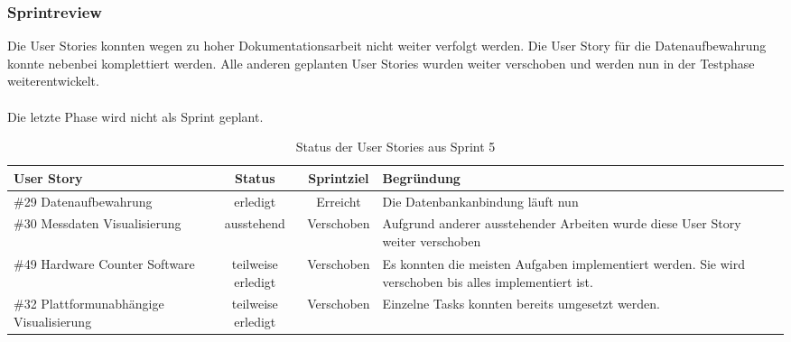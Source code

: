 \subsubsection*{Sprintreview}%
Die User Stories konnten wegen zu hoher Dokumentationsarbeit nicht weiter verfolgt werden. Die User Story für die Datenaufbewahrung konnte nebenbei komplettiert werden. Alle anderen geplanten User Stories wurden weiter verschoben und werden nun in der Testphase weiterentwickelt.\\\\
Die letzte Phase wird nicht als Sprint geplant.
\begin{table}[H]
    \centering
    \begin{tabular}{p{4cm}ccp{7cm}}
        \textbf{User Story} &  \textbf{Status} & \textbf{Sprintziel}& \textbf{Begründung}\\\toprule[2pt]
        \#29 Datenaufbewahrung & erledigt & Erreicht & Die Datenbankanbindung läuft nun\\
        \#30 Messdaten Visualisierung & ausstehend & Verschoben & Aufgrund anderer ausstehender Arbeiten wurde diese User Story weiter verschoben\\
        \#49 Hardware Counter Software & teilweise erledigt & Verschoben & Es konnten die meisten Aufgaben implementiert werden. Sie wird verschoben bis alles implementiert ist.\\
        \#32 Plattformunabhängige Visualisierung & teilweise erledigt & Verschoben & Einzelne Tasks konnten bereits umgesetzt werden.\\
    \end{tabular}
    \caption{Status der User Stories aus Sprint 5}
\end{table}